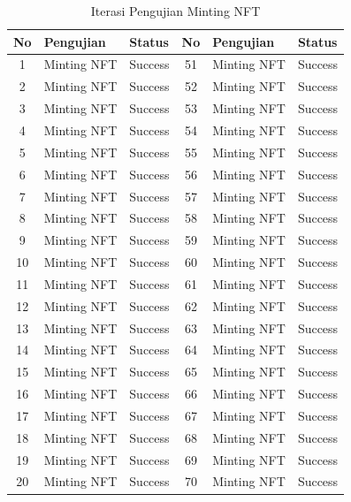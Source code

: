   \begin{longtable}[c]{|c|l|l||c|l|l|}
    \caption{Iterasi Pengujian Minting NFT}
    \label{tab:iterasi_pengujian_minting}\\
    \hline
    \textbf{No} & \textbf{Pengujian} & \textbf{Status} & \textbf{No} & \textbf{Pengujian} & \textbf{Status} \\ \hline
    \endfirsthead
    \endhead
    1  & Minting NFT & Success & 51 & Minting NFT & Success \\ \hline
    2  & Minting NFT & Success & 52 & Minting NFT & Success \\ \hline
    3  & Minting NFT & Success & 53 & Minting NFT & Success \\ \hline
    4  & Minting NFT & Success & 54 & Minting NFT & Success \\ \hline
    5  & Minting NFT & Success & 55 & Minting NFT & Success \\ \hline
    6  & Minting NFT & Success & 56 & Minting NFT & Success \\ \hline
    7  & Minting NFT & Success & 57 & Minting NFT & Success \\ \hline
    8  & Minting NFT & Success & 58 & Minting NFT & Success \\ \hline
    9  & Minting NFT & Success & 59 & Minting NFT & Success \\ \hline
    10 & Minting NFT & Success & 60 & Minting NFT & Success \\ \hline
    11 & Minting NFT & Success & 61 & Minting NFT & Success \\ \hline
    12 & Minting NFT & Success & 62 & Minting NFT & Success \\ \hline
    13 & Minting NFT & Success & 63 & Minting NFT & Success \\ \hline
    14 & Minting NFT & Success & 64 & Minting NFT & Success \\ \hline
    15 & Minting NFT & Success & 65 & Minting NFT & Success \\ \hline
    16 & Minting NFT & Success & 66 & Minting NFT & Success \\ \hline
    17 & Minting NFT & Success & 67 & Minting NFT & Success \\ \hline
    18 & Minting NFT & Success & 68 & Minting NFT & Success \\ \hline
    19 & Minting NFT & Success & 69 & Minting NFT & Success \\ \hline
    20 & Minting NFT & Success & 70 & Minting NFT & Success \\ \hline

\end{longtable}
